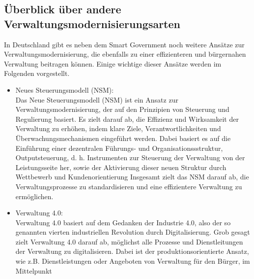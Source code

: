 \subsection{Überblick über andere Verwaltungsmodernisierungsarten}
In Deutschland gibt es neben dem Smart Government noch weitere Ansätze zur Verwaltungsmodernisierung, die ebenfalls zu einer effizienteren und bürgernahen Verwaltung beitragen können. 
Einige wichtige dieser Ansätze werden im Folgenden vorgestellt.

\begin{itemize}
 \item Neues Steuerungsmodell (NSM):\\
Das Neue Steuerungsmodell (NSM) ist ein Ansatz zur Verwaltungsmodernisierung, der auf den Prinzipien von Steuerung und Regulierung basiert. 
Es zielt darauf ab, die Effizienz und Wirksamkeit der Verwaltung zu erhöhen, indem klare Ziele, Verantwortlichkeiten und Überwachungsmechanismen eingeführt werden.
Dabei basiert es auf die Einführung einer dezentralen Führungs- und Organisationssstruktur, Outputsteuerung, d. h. Instrumenten zur Steuerung der Verwaltung von der Leistungsseite her, sowie der Aktivierung dieser neuen Struktur durch Wettbewerb und Kundenorientierung \citep[Vgl.][S.131]{Veit2019}
Insgesamt zielt das NSM darauf ab, die Verwaltungsprozesse zu standardisieren und eine effizientere Verwaltung zu ermöglichen.
\item Verwaltung 4.0:\\
Verwaltung 4.0 basiert auf dem Gedanken der Industrie 4.0, also der so genannten vierten industriellen Revolution durch Digitalisierung.
Grob gesagt zielt Verwaltung 4.0 darauf ab, möglichst alle Prozesse und Dienstleitungen der Verwaltung zu digitalisieren.
Dabei ist der produktionsorientierte Ansatz, wie z.B. Dienstleistungen oder Angeboten von Verwaltung für den Bürger, im Mittelpunkt \citep[Vgl.][S. 27-28]{Schuppan2016}
\end{itemize}

